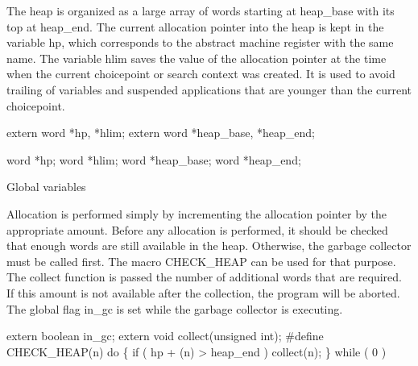 \nwendcode{}\nwdocspar
The heap is organized as a large array of words starting at
{\Tt{}heap{\_}base\nwendquote} with its top at {\Tt{}heap{\_}end\nwendquote}. The current allocation
pointer into the heap is kept in the variable {\Tt{}hp\nwendquote}, which
corresponds to the abstract machine register with the same name. The
variable {\Tt{}hlim\nwendquote} saves the value of the allocation pointer at the
time when the current choicepoint or search context was created. It is
used to avoid trailing of variables and suspended applications that
are younger than the current choicepoint.

\nwenddocs{}\plusendmoddef\nwstartdeflinemarkup{}\nwenddeflinemarkup
extern word *hp, *hlim;
extern word *heap_base, *heap_end;

\nwendcode{}\nwdocspar
\nwenddocs{}\plusendmoddef\nwstartdeflinemarkup{}\nwenddeflinemarkup
word *hp;
word *hlim;
word *heap_base;
word *heap_end;

\LA{}Global variables~{\nwtagstyle{}}\RA{}

\nwendcode{}\nwdocspar
Allocation is performed simply by incrementing the allocation pointer
by the appropriate amount. Before any allocation is performed, it
should be checked that enough words are still available in the heap.
Otherwise, the garbage collector must be called first. The macro
{\Tt{}CHECK{\_}HEAP\nwendquote} can be used for that purpose. The {\Tt{}collect\nwendquote} function
is passed the number of additional words that are required. If this
amount is not available after the collection, the program will be
aborted. The global flag {\Tt{}in{\_}gc\nwendquote} is set while the garbage collector
is executing.

\nwenddocs{}\plusendmoddef\nwstartdeflinemarkup{}\nwenddeflinemarkup
extern boolean in_gc;
extern void collect(unsigned int);
#define CHECK_HEAP(n) do \{ if ( hp + (n) > heap_end ) collect(n); \} while ( 0 )

